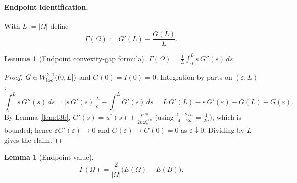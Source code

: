 \documentclass[11pt]{article}
\newtheorem{lemma}[theorem]{Lemma}
\theoremstyle{definition}
\newcommand{\Om}{\Omega}
\newcommand{\eps}{\varepsilon}
\begin{document}
\paragraph{Endpoint identification.} With $L:=|\Om|$ define
\begin{equation}\label{eq:Gammadef}
   \Gamma(\Om):=G'(L)-\frac{G(L)}{L}.
\end{equation}

\begin{lemma}[Endpoint convexity-gap formula]\label{lem:gap}
$\Gamma(\Om)=\frac{1}{L}\int_{0}^{L}s\,G''(s)\,ds$.
\end{lemma}

\begin{proof}
$G\in W^{2,1}_{\rm loc}((0,L])$ and $G(0)=I(0)=0$. Integration by parts
on $(\eps,L)$:
\[
   \int_{\eps}^{L}s\,G''(s)\,ds
   =\bigl[s\,G'(s)\bigr]_{\eps}^{L}-\int_{\eps}^{L}G'(s)\,ds
   =L\,G'(L)-\eps\,G'(\eps)-G(L)+G(\eps).
\]
By Lemma~\ref{lem:I3b}, $G'(s)=u^{*}(s)+\frac{s^{2/n}}{2n\omega_{n}^{2/n}}$
(using $\frac{1+2/n}{4+2n}=\frac{1}{2n}$),
which is bounded; hence $\eps G'(\eps)\to 0$ and $G(\eps)\to G(0)=0$ as
$\eps\downarrow 0$. Dividing by $L$ gives the claim.
\end{proof}

\begin{lemma}[Endpoint value]\label{lem:endpoint}
\begin{equation}\label{eq:endpoint}
   \Gamma(\Om)=\frac{2}{|\Om|}\bigl(E(\Om)-E(B)\bigr).
\end{equation}
\end{lemma}
\end{document}
